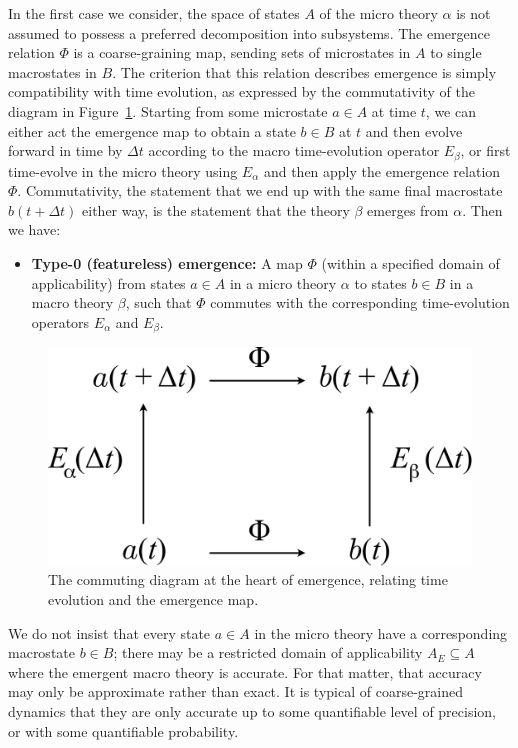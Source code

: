 \documentclass[12pt,english]{article}
\begin{document}
In the first case we consider, the space of states  $A$ of the micro theory  $\alpha$  is not assumed to possess a preferred decomposition into subsystems.
The emergence relation $\Phi$ is a coarse-graining map, sending sets of microstates in $A$ to single macrostates in $B$. 
The criterion that this relation describes emergence is simply compatibility with time evolution, as expressed by the commutativity of the diagram in Figure~\ref{commuting}. 
Starting from some microstate $a\in A$ at time $t$, we can either act the emergence map to obtain a state $b\in B$ at $t$ and then evolve forward in time by $\Delta t$ according to the macro time-evolution operator $E_\beta$, or first time-evolve in the micro theory using $E_\alpha$ and then apply the emergence relation $\Phi$. 
Commutativity, the statement that we end up with the same final macrostate $b(t+\Delta t)$ either way, is the statement that the theory $\beta$ emerges from  $\alpha$.
Then we have:
\begin{itemize}
    \item \textbf{Type-0 (featureless) emergence:} 
    A map $\Phi$ (within a specified domain of applicability) from states $a\in A$ in a micro theory $\alpha$ to states $b\in B$ in a macro theory $\beta$, such that $\Phi$ commutes with the corresponding time-evolution operators $E_\alpha$ and $E_\beta$.
\end{itemize}

\begin{figure}[h]
\includegraphics[scale=0.7]{commuting.pdf}
\centering
\caption{The commuting diagram at the heart of emergence, relating time evolution and the emergence map.}
\label{commuting}
\end{figure}

We do not insist that every state $a\in A$ in the micro theory have a corresponding macrostate $b\in B$; there may be a restricted domain of applicability $A_E \subseteq A$ where the emergent macro theory is accurate. 
For that matter, that accuracy may only be approximate rather than exact. 
It is typical of coarse-grained dynamics that they are only accurate up to some quantifiable level of precision, or with some quantifiable probability.
\end{document}

